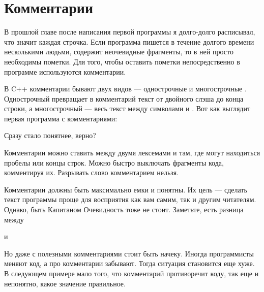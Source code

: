 \documentclass[book.tex]{subfiles}
\begin{document}



\maketitle 

\section*{Комментарии}

В прошлой главе после написания первой программы я долго-долго расписывал, что значит каждая строчка. Если программа пишется в течение долгого времени несколькими людьми, содержит неочевидные фрагменты, то в ней просто необходимы пометки. Для того, чтобы оставить пометки непосредственно в программе используются комментарии.


В C++ комментарии бывают двух видов --- однострочные \cppword{//} и многострочные \cppword{/**/}. Однострочный превращает в комментарий текст от двойного слэша \cppword{//} до конца строки, а многострочный --- весь текст между символами \cppword{/*} и \cppword{*/}. Вот как выглядит первая программа с комментариями:


Сразу стало понятнее, верно?

Комментарии можно ставить между двумя лексемами и там, где могут находиться пробелы или концы строк. Можно быстро выключать фрагменты кода, комментируя их. Разрывать слово комментарием нельзя.

Комментарии должны быть максимально емки и понятны. Их цель --- сделать текст программы проще для восприятия как вам самим, так и другим читателям. Однако, быть Капитаном Очевидность тоже не стоит. Заметьте, есть разница между


и


Но даже с полезными комментариями стоит быть начеку. Иногда программисты меняют код, а про комментарии забывают. Тогда ситуация становится еще хуже. В следующем примере мало того, что комментарий противоречит коду, так еще и непонятно, какое значение правильное.
\end{document}
